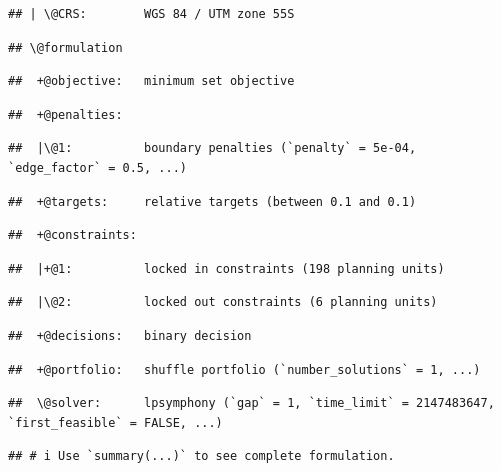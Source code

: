 \documentclass[
  12pt,
]{book}
\begin{document}
\begin{verbatim}
## | \@CRS:        WGS 84 / UTM zone 55S
\end{verbatim}

\begin{verbatim}
## \@formulation
\end{verbatim}

\begin{verbatim}
##  +@objective:   minimum set objective
\end{verbatim}

\begin{verbatim}
##  +@penalties:
\end{verbatim}

\begin{verbatim}
##  |\@1:          boundary penalties (`penalty` = 5e-04, `edge_factor` = 0.5, ...)
\end{verbatim}

\begin{verbatim}
##  +@targets:     relative targets (between 0.1 and 0.1)
\end{verbatim}

\begin{verbatim}
##  +@constraints:
\end{verbatim}

\begin{verbatim}
##  |+@1:          locked in constraints (198 planning units)
\end{verbatim}

\begin{verbatim}
##  |\@2:          locked out constraints (6 planning units)
\end{verbatim}

\begin{verbatim}
##  +@decisions:   binary decision
\end{verbatim}

\begin{verbatim}
##  +@portfolio:   shuffle portfolio (`number_solutions` = 1, ...)
\end{verbatim}

\begin{verbatim}
##  \@solver:      lpsymphony (`gap` = 1, `time_limit` = 2147483647, `first_feasible` = FALSE, ...)
\end{verbatim}

\begin{verbatim}
## # i Use `summary(...)` to see complete formulation.
\end{verbatim}
\end{document}
